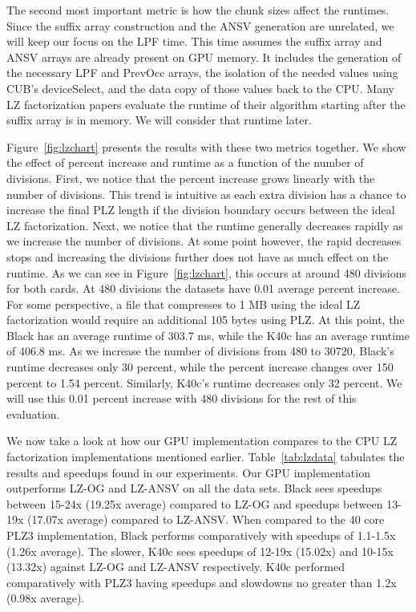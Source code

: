 The second most important metric is how the chunk sizes affect the runtimes. 
Since the suffix array construction and the ANSV generation are unrelated, we will keep our focus on the LPF time.
This time assumes the suffix array and ANSV arrays are already present on GPU memory.
It includes the generation of the necessary LPF and PrevOcc arrays, the isolation of the needed values using CUB's deviceSelect, and the data copy of those values back to the CPU.
Many LZ factorization papers evaluate the runtime of their algorithm starting after the suffix array is in memory.
We will consider that runtime later.

Figure~\ref{fig:lzchart} presents the results with these two metrics together.
We show the effect of percent increase and runtime as a function of the number of divisions.
First, we notice that the percent increase grows linearly with the number of divisions.
This trend is intuitive as each extra division has a chance to increase the final PLZ length if the division boundary occurs between the ideal LZ factorization.
Next, we notice that the runtime generally decreases rapidly as we increase the number of divisions.
At some point however, the rapid decreases stops and increasing the divisions further does not have as much effect on the runtime.
As we can see in Figure~\ref{fig:lzchart}, this occurs at around 480 divisions for both cards.
At 480 divisions the datasets have 0.01 average percent increase.
For some perspective, a file that compresses to 1 MB using the ideal LZ factorization would require an additional 105 bytes using PLZ.
At this point, the Black has an average runtime of 303.7 ms, while the K40c has an average runtime of 406.8 ms.
As we increase the number of divisions from 480 to 30720, Black's runtime decreases only 30 percent, while the percent increase changes over 150 percent to 1.54 percent.
Similarly, K40c's runtime decreases only 32 percent.
We will use this 0.01 percent increase with 480 divisions for the rest of this evaluation.

We now take a look at how our GPU implementation compares to the CPU LZ factorization implementations mentioned earlier.
Table~\ref{tab:lzdata} tabulates the results and speedups found in our experiments.
Our GPU implementation outperforms LZ-OG and LZ-ANSV on all the data sets.
Black sees speedups between 15-24x (19.25x average) compared to LZ-OG and speedups between 13-19x (17.07x average) compared to LZ-ANSV.
When compared to the 40 core PLZ3 implementation, Black performs comparatively with speedups of 1.1-1.5x (1.26x average).
The slower, K40c sees speedups of 12-19x (15.02x) and 10-15x (13.32x) against LZ-OG and LZ-ANSV respectively.
K40c performed comparatively with PLZ3 having speedups and slowdowns no greater than 1.2x (0.98x average).


